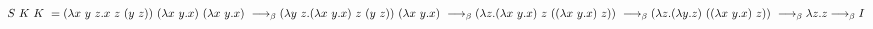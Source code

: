 \documentclass{article}
\begin{document}
$\\
S\ K\ K\ = \\
(\lambda x\ y\ z.x\ z\ (y\ z))\ (\lambda x\ y.x)\ (\lambda x\ y.x)\  \longrightarrow_\beta \\
(\lambda y\ z.(\lambda x\ y.x)\ z\ (y\ z))\ (\lambda x\ y.x)\  \longrightarrow_\beta \\
(\lambda z.(\lambda x\ y.x)\ z\ ((\lambda x\ y.x)\ z))\  \longrightarrow_\beta \\
(\lambda z.(\lambda y.z)\ ((\lambda x\ y.x)\ z))\  \longrightarrow_\beta \\
\lambda z.z  \longrightarrow_\beta \\
I
$
\end{document}
